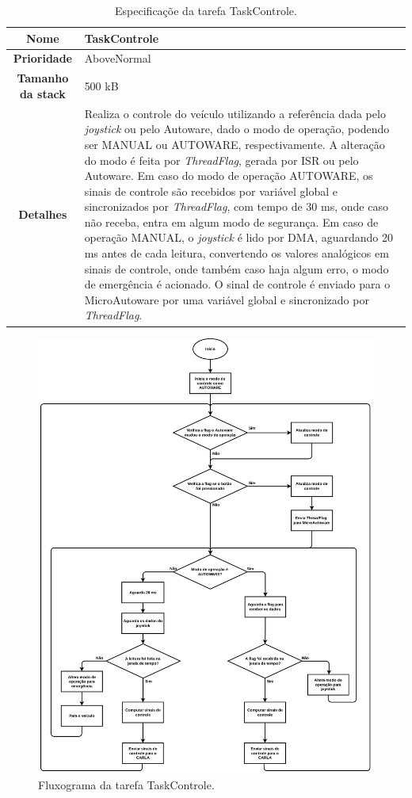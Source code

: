 \begin{table}[H]
	\centering
	\begin{tabular}{c|p{11.5cm}}
	\textbf{Nome} & TaskControle \\
	\hline
	\textbf{Prioridade}& AboveNormal \\
	\hline
	\textbf{Tamanho da stack} & 500 kB \\
	\hline
	\textbf{Detalhes} & Realiza o controle do veículo utilizando a referência dada pelo \textit{joystick} ou pelo Autoware, dado o modo de operação, podendo ser MANUAL ou AUTOWARE, respectivamente. A alteração do modo é feita por \textit{ThreadFlag}, gerada por ISR ou pelo Autoware. Em caso do modo de operação AUTOWARE, os sinais de controle são recebidos por variável global e sincronizados por \textit{ThreadFlag}, com tempo de 30 ms, onde caso não receba, entra em algum modo de segurança. Em caso de operação MANUAL,  o \textit{joystick} é lido por DMA, aguardando 20 ms antes de cada leitura,  convertendo os valores analógicos em sinais de controle, onde também caso haja algum erro, o modo de emergência é acionado. O sinal de controle é enviado para o MicroAutoware por uma variável global e sincronizado por \textit{ThreadFlag}. 
	\end{tabular}
	\caption{Especificaçõe da tarefa TaskControle.}
	\label{tab:taskcontrole}
\end{table}

\begin{figure}[H]
	\centering
	\includegraphics[height= 0.8\textheight]{img/fluxograma_taskcontrole}
	\caption{Fluxograma da tarefa TaskControle.}
	\label{fig:fluxograma_taskcontrole}
\end{figure}


